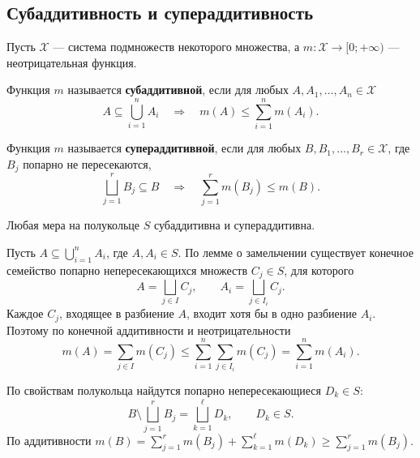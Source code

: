 \clearpage
\begingroup
{}
\everymath{\textstyle}
\subsection{Субаддитивность и супераддитивность}

Пусть $\mathcal X$ --- система подмножеств некоторого множества,
а $m\colon\mathcal X\to[0;+\infty)$ --- неотрицательная функция.

\begin{definition}[Субаддитивность]
    Функция $m$ называется \textbf{субаддитивной}, если для любых
    $A,A_1,\ldots,A_n\in\mathcal X$
    \[
        A\subseteq\bigcup_{i=1}^{n}A_i
        \quad\Longrightarrow\quad
        m(A)\leq\sum_{i=1}^{n}m(A_i).
    \]
\end{definition}

\begin{definition}[Супераддитивность]
    Функция $m$ называется \textbf{супераддитивной}, если для любых
    $B,B_1,\ldots,B_r\in\mathcal X$, где $B_j$ попарно не пересекаются,
    \[
        \bigsqcup_{j=1}^{r}B_j\subseteq B
        \quad\Longrightarrow\quad
        \sum_{j=1}^{r}m(B_j)\leq m(B).
    \]
\end{definition}

\begin{theorem}
    Любая мера на полукольце $S$ субаддитивна и супераддитивна.
\end{theorem}

\begin{Proof}[Субаддитивность]
    Пусть $A\subseteq\bigcup_{i=1}^{n}A_i$, где $A,A_i\in S$.
    По лемме о замельчении существует конечное семейство попарно
    непересекающихся множеств $C_j\in S$, для которого
    \[
        A=\bigsqcup_{j\in I}C_j,\qquad
        A_i=\bigsqcup_{j\in I_i}C_j.
    \]
    Каждое $C_j$, входящее в разбиение $A$, входит хотя бы в одно разбиение
    $A_i$. Поэтому по конечной аддитивности и неотрицательности
    \[
        m(A)=\sum_{j\in I}m(C_j)
        \leq\sum_{i=1}^{n}\sum_{j\in I_i}m(C_j)
        =\sum_{i=1}^{n}m(A_i).
    \]
\end{Proof}

\begin{Proof}[Супераддитивность]
    По свойствам полукольца найдутся попарно непересекающиеся $D_k\in S$:
    \[
        B\setminus\bigsqcup_{j=1}^{r}B_j
        =\bigsqcup_{k=1}^{\ell}D_k,\qquad D_k\in S.
    \]
    По аддитивности $m(B)=\sum_{j=1}^{r}m(B_j)+\sum_{k=1}^{\ell}m(D_k)
    \geq\sum_{j=1}^{r}m(B_j)$.
\end{Proof}

